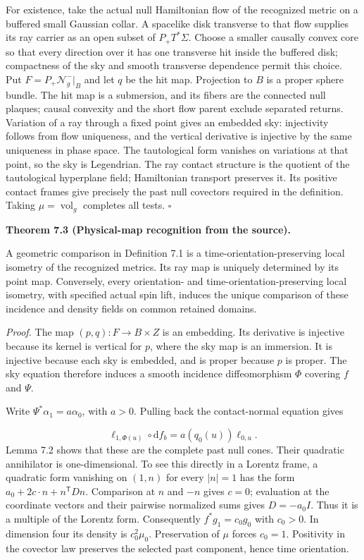 \documentclass[
  english,
  11pt,
  reqno]{amsart}
\makeatletter
\newcommand{\pandocstatementheading}[1]{%
  \par\addpenalty{\@beginparpenalty}%
  \addvspace{.5\baselineskip plus .2\baselineskip minus .2\baselineskip}%
  {\normalfont\bfseries #1\par}%
  \nobreak\@afterindenttrue\@afterheading
}
\makeatother
\begin{document}
For existence, take the actual null Hamiltonian flow of the recognized
metric on a buffered small Gaussian collar. A spacelike disk transverse
to that flow supplies its ray carrier as an open subset of
\(P_+T^*\Sigma\). Choose a smaller causally convex core so that every
direction over it has one transverse hit inside the buffered disk;
compactness of the sky and smooth transverse dependence permit this
choice. Put \(F=P_+\mathcal N_g^-|_B\) and let \(q\) be the hit map.
Projection to \(B\) is a proper sphere bundle. The hit map is a
submersion, and its fibers are the connected null plaques; causal
convexity and the short flow parent exclude separated returns. Variation
of a ray through a fixed point gives an embedded sky: injectivity
follows from flow uniqueness, and the vertical derivative is injective
by the same uniqueness in phase space. The tautological form vanishes on
variations at that point, so the sky is Legendrian. The ray contact
structure is the quotient of the tautological hyperplane field;
Hamiltonian transport preserves it. Its positive contact frames give
precisely the past null covectors required in the definition. Taking
\(\mu=\operatorname{vol}_g\) completes all tests. \hfill\(\square\)

\pandocstatementheading{\leavevmode{}\label{thm:online-incidence-physical-recognition}Theorem 7.3 (Physical-map recognition from the source).}

A geometric comparison in Definition 7.1 is a
time-orientation-preserving local isometry of the recognized metrics.
Its ray map is uniquely determined by its point map. Conversely, every
orientation- and time-orientation-preserving local isometry, with
specified actual spin lift, induces the unique comparison of these
incidence and density fields on common retained domains.

\emph{Proof.} The map \((p,q):F\to B\times Z\) is an embedding. Its
derivative is injective because its kernel is vertical for \(p\), where
the sky map is an immersion. It is injective because each sky is
embedded, and is proper because \(p\) is proper. The sky equation
therefore induces a smooth incidence diffeomorphism \(\Phi\) covering
\(f\) and \(\Psi\).

Write \(\Psi^*\alpha_1=a\alpha_0\), with \(a>0\). Pulling back the
contact-normal equation gives

\label{eq:online-incidence-arrow-covector-law} \[
\ell_{1,\Phi(u)}\circ\mathrm df_b
=a(q_0(u))\ell_{0,u}.
\] Lemma 7.2 shows that these are the complete past null cones. Their
quadratic annihilator is one-dimensional. To see this directly in a
Lorentz frame, a quadratic form vanishing on \((1,n)\) for every
\(|n|=1\) has the form \(a_0+2c\cdot n+n^{\mathsf T}Dn\). Comparison at
\(n\) and \(-n\) gives \(c=0\); evaluation at the coordinate vectors and
their pairwise normalized sums gives \(D=-a_0I\). Thus it is a multiple
of the Lorentz form. Consequently \(f^*g_1=c_0g_0\) with \(c_0>0\). In
dimension four its density is \(c_0^2\mu_0\). Preservation of \(\mu\)
forces \(c_0=1\). Positivity in the covector law preserves the selected
past component, hence time orientation.
\end{document}
